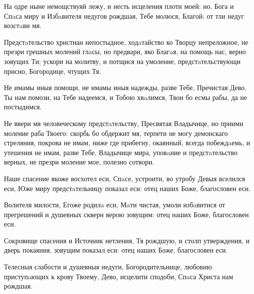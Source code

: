 \begin{mymulticols}
На одре ныне немощствуяй лежу, и несть исцеления плоти моей: но, Бога и Спaса миру и Избaвителя недугов рождшая, Тебе молюся, Благой: от тли недуг возстaви мя.


Предстaтельство христиан непостыдное, ходaтайство ко Творцу непреложное, не презри грешных молений глaсы, но предвари, яко Благaя, на помощь нас, верно зовущих Ти; ускори на молитву, и потщися на умоление, предстaтельствующи присно, Богородице, чтущих Тя.


Не имамы иныя помощи, не имамы иныя надежды, разве Тебе, Пречистая Дево. Ты нам помози, на Тебе надеемся, и Тобою хвaлимся, Твои бо есмы рабы, да не постыдимся.


Не ввери мя человеческому предстaтельству, Пресвятая Владычице, но приими моление раба Твоего: скорбь бо обдержит мя, терпети не могу демонскаго стреляния, покрова не имам, ниже где прибегну, окаянный, всегда побеждaемь, и утешения не имам, разве Тебе, Владычице мира, уповaние и предстaтельство верных, не презри моление мое, полезно сотвори.




Наше спасение якоже восхотел еси, Спaсе, устроити, во утробу Девыя вселился еси, Юже миру предстaтельницу показал еси: отец наших Боже, благословен еси.


Волителя милости, Егоже родилa еси, Мaти чистая, умоли избaвитися от прегрешений и душевных скверн верою зовущим: отец наших Боже, благословен еси.

\slava

Сокровище спасения и Источник нетления, Тя рождшую, и столп утверждения, и дверь покаяния, зовущим показал еси: отец наших Боже, благословен еси.

\inyne

Телесныя слабости и душевныя недуги, Богородительнице, любовию приступaющих к крову Твоему, Дево, исцелити сподоби, Спaса Христа нам рождшая.



\end{mymulticols}
